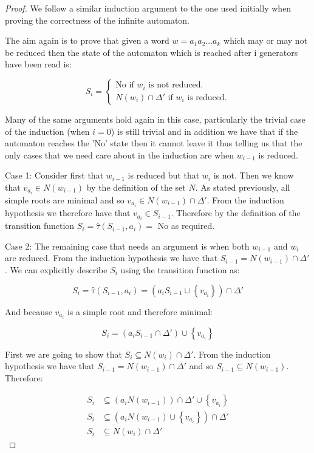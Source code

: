 \documentclass[a4paper,12pt]{article}
\begin{document}
\begin{proof}
	We follow a similar induction argument to the one used initially when proving the correctness of the infinite automaton.
	
	The aim again is to prove that given a word $w = a_1a_2 \ldots a_k$ which may or may not be reduced then the state of the automaton which is reached after i generators have been read is:
	
	\begin{equation*}
		S_i = 
		\begin{cases}
			\text{No   if $w_i$ is not reduced.} \\
			N(w_i) \cap \Delta' \text{ if $w_i$ is reduced.}
		\end{cases}
	\end{equation*}
	
	Many of the same arguments hold again in this case, particularly the trivial case of the induction (when $i = 0$) is still trivial and in addition we have that if the automaton reaches the 'No' state then it cannot leave it thus telling us that the only cases that we need care about in the induction are when $w_{i-1}$ is reduced.
	
	Case 1: Consider first that $w_{i-1}$ is reduced but that $w_i$ is not. Then we know that $v_{a_i} \in N(w_{i-1})$ by the definition of the set $N$. As stated previously, all simple roots are minimal and so $v_{a_i} \in N(w_{i-1}) \cap \Delta'$. From the induction hypothesis we therefore have that $v_{a_i} \in S_{i-1}$. Therefore by the definition of the transition function $S_i = \hat{\tau}(S_{i-1}, a_i) = \text{ No}$ as required.
	
	Case 2: The remaining case that needs an argument is when both $w_{i-1}$ and $w_i$ are reduced. From the induction hypothesis we have that $S_{i-1} = N(w_{i-1}) \cap \Delta'$. We can explicitly describe $S_i$ using the transition function as:
	
	\[S_i = \hat{\tau}(S_{i-1}, a_i) = (a_iS_{i-1} \cup \left\{v_{a_i}\right\}) \cap \Delta' \]
	
	And because $v_{a_i}$ is a simple root and therefore minimal:
	
	\[S_i = (a_iS_{i-1} \cap \Delta') \cup \left\{v_{a_i}\right\}\]
	
	First we are going to show that $S_i \subseteq N(w_i) \cap \Delta'$. From the induction hypothesis we have that $S_{i-1} = N(w_{i-1}) \cap \Delta'$ and so $S_{i-1} \subseteq N(w_{i-1})$. Therefore:
	
	\begin{align*}
		S_i &\subseteq (a_iN(w_{i-1})) \cap \Delta' \cup \left\{v_{a_i}\right\} \\
		S_i &\subseteq (a_iN(w_{i-1}) \cup \left\{v_{a_i}\right\}) \cap \Delta' \\
		S_i &\subseteq N(w_i) \cap \Delta'
	\end{align*}
	

\end{proof}
\end{document}
